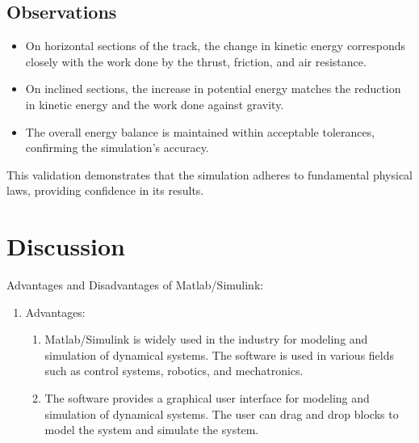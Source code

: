 \documentclass{article}
\begin{document}
\begin{itemize}
    \subsection{Observations}
    \begin{itemize}
        \item On horizontal sections of the track, the change in kinetic energy
            corresponds closely with the work done by the thrust, friction, and
            air resistance.

        \item On inclined sections, the increase in potential energy matches the
            reduction in kinetic energy and the work done against gravity.

        \item The overall energy balance is maintained within acceptable tolerances,
            confirming the simulation's accuracy.
    \end{itemize}

    This validation demonstrates that the simulation adheres to fundamental
    physical laws, providing confidence in its results.

    \section{Discussion}
    Advantages and Disadvantages of Matlab/Simulink:
    \begin{enumerate}
        \item Advantages:
            \begin{enumerate}
                \item Matlab/Simulink is widely used in the industry for modeling
                    and simulation of dynamical systems. The software is used in
                    various fields such as control systems, robotics, and
                    mechatronics.

                \item The software provides a graphical user interface for modeling
                    and simulation of dynamical systems. The user can drag and
                    drop blocks to model the system and simulate the system.


\end{enumerate}
\end{enumerate}
\end{itemize}
\end{document}
